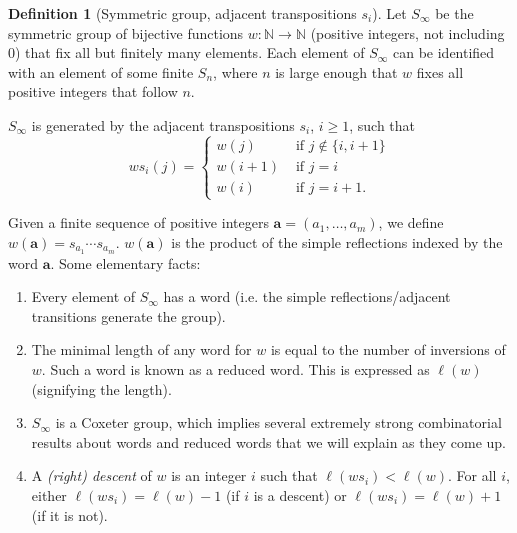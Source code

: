\documentclass{elsarticle}
\theoremstyle{definition}
\newtheorem{definition}[lemma]{Definition}
\theoremstyle{remark}
\numberwithin{equation}{subsection}
\begin{document}
\newcommand{\wt}{\mathrm{weight}}
\newcommand{\RC}{\mathrm{RC}}
\begin{definition}[Symmetric group, adjacent transpositions $s_i$]
Let $S_\infty$ be the symmetric group of bijective functions $w:\mathbb{N}\to\mathbb{N}$ (positive integers, not including $0$) that fix all but finitely many elements. Each element of $S_\infty$ can be identified with an element of some finite $S_n$, where $n$ is large enough that $w$ fixes all positive integers that follow $n$.

$S_\infty$ is generated by the adjacent transpositions $s_i$, $i\geq 1$, such that
$$ws_i(j)=\begin{cases}
	w(j)&\mbox{ if }j\notin \{i,i+1\}\\
	w(i+1)&\mbox{ if }j=i\\
	w(i)&\mbox{ if }j=i+1.
\end{cases}$$

Given a finite sequence of positive integers $\mathbf{a}=(a_1,\ldots,a_m)$, we define $w(\mathbf{a})=s_{a_1}\cdots s_{a_m}$. $w(\mathbf{a})$ is the product of the simple reflections indexed by the word $\mathbf{a}$. Some elementary facts:
\begin{enumerate}
	\item Every element of $S_\infty$ has a word (i.e. the simple reflections/adjacent transitions generate the group).
	
	\item The minimal length of any word for $w$ is equal to the number of inversions of $w$. Such a word is known as a reduced word. This is expressed as $\ell(w)$ (signifying the length).
	
	\item $S_\infty$ is a Coxeter group, which implies several extremely strong combinatorial results about words and reduced words that we will explain as they come up.
	
	\item A \emph{(right) descent} of $w$ is an integer $i$ such that $\ell(ws_i)<\ell(w)$. For all $i$, either $\ell(ws_i)=\ell(w)-1$ (if $i$ is a descent) or $\ell(ws_i) = \ell(w)+1$ (if it is not).
\end{enumerate}
\end{definition}
	
\end{document}
